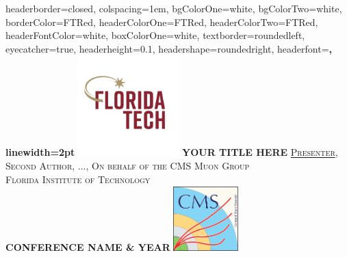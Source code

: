 \documentclass[landscape,a0paper,fontscale=0.42]{baposter} %
\begin{document}
\begin{poster}{
	headerborder=closed, %
	colspacing=1em, %
	bgColorOne=white, %
	bgColorTwo=white, %
	borderColor=FTRed, %
	headerColorOne=FTRed, %
	headerColorTwo=FTRed, %
	headerFontColor=white, %
	boxColorOne=white, %
	textborder=roundedleft, %
	eyecatcher=true, %
	headerheight=0.1\textheight, %
	headershape=roundedright, %
	headerfont=\Large\bf\textsc, %
	linewidth=2pt %
}
%
{\includegraphics[height=3.9cm]{FloridaTechNewLogo.png}} %
{\bf\textsc{\Huge{YOUR TITLE HERE}}} %
{\LARGE{\textsc{\underline{Presenter}, Second Author, ..., On behalf of the CMS Muon Group\\ Florida Institute of Technology}}\\

\textsc{\textbf{\textcolor{FTRed}{\Large{CONFERENCE NAME \& YEAR}}}}
} %
{\includegraphics[height=2.5cm]{CMS_logo_May2014.pdf}} %



\end{poster}
\end{document}
